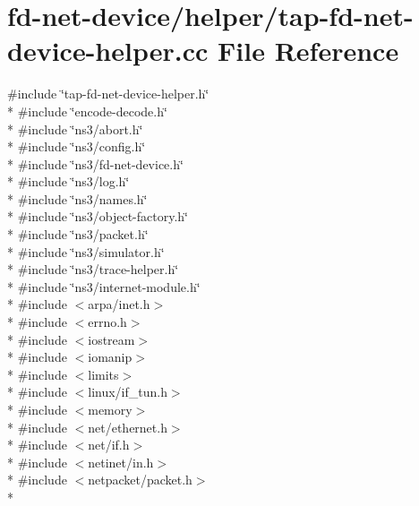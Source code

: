 \hypertarget{tap-fd-net-device-helper_8cc}{}\section{fd-\/net-\/device/helper/tap-\/fd-\/net-\/device-\/helper.cc File Reference}
\label{tap-fd-net-device-helper_8cc}
{\ttfamily \#include \char`\"{}tap-\/fd-\/net-\/device-\/helper.\+h\char`\"{}}\\*
{\ttfamily \#include \char`\"{}encode-\/decode.\+h\char`\"{}}\\*
{\ttfamily \#include \char`\"{}ns3/abort.\+h\char`\"{}}\\*
{\ttfamily \#include \char`\"{}ns3/config.\+h\char`\"{}}\\*
{\ttfamily \#include \char`\"{}ns3/fd-\/net-\/device.\+h\char`\"{}}\\*
{\ttfamily \#include \char`\"{}ns3/log.\+h\char`\"{}}\\*
{\ttfamily \#include \char`\"{}ns3/names.\+h\char`\"{}}\\*
{\ttfamily \#include \char`\"{}ns3/object-\/factory.\+h\char`\"{}}\\*
{\ttfamily \#include \char`\"{}ns3/packet.\+h\char`\"{}}\\*
{\ttfamily \#include \char`\"{}ns3/simulator.\+h\char`\"{}}\\*
{\ttfamily \#include \char`\"{}ns3/trace-\/helper.\+h\char`\"{}}\\*
{\ttfamily \#include \char`\"{}ns3/internet-\/module.\+h\char`\"{}}\\*
{\ttfamily \#include $<$arpa/inet.\+h$>$}\\*
{\ttfamily \#include $<$errno.\+h$>$}\\*
{\ttfamily \#include $<$iostream$>$}\\*
{\ttfamily \#include $<$iomanip$>$}\\*
{\ttfamily \#include $<$limits$>$}\\*
{\ttfamily \#include $<$linux/if\+\_\+tun.\+h$>$}\\*
{\ttfamily \#include $<$memory$>$}\\*
{\ttfamily \#include $<$net/ethernet.\+h$>$}\\*
{\ttfamily \#include $<$net/if.\+h$>$}\\*
{\ttfamily \#include $<$netinet/in.\+h$>$}\\*
{\ttfamily \#include $<$netpacket/packet.\+h$>$}\\*
